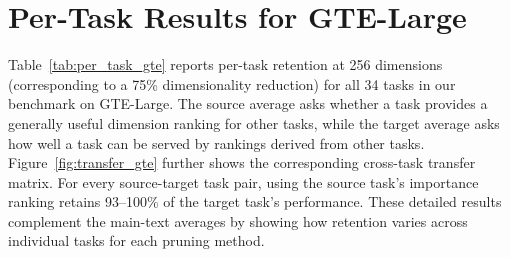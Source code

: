 \documentclass[11pt]{article}
\begin{document}
\section{Per-Task Results for GTE-Large}
\label{sec:per_task_gte}
Table~\ref{tab:per_task_gte} reports per-task retention at 256 dimensions (corresponding to a 75\% dimensionality reduction) for all 34 tasks in our benchmark on GTE-Large. The source average asks whether a task provides a generally useful dimension ranking for other tasks, while the target average asks how well a task can be served by rankings derived from other tasks. Figure~\ref{fig:transfer_gte} further shows the corresponding cross-task transfer matrix. For every source-target task pair, using the source task's importance ranking retains 93--100\% of the target task's performance. These detailed results complement the main-text averages by showing how retention varies across individual tasks for each pruning method.
\end{document}

